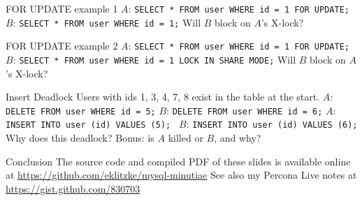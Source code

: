 \documentclass[14pt]{beamer}
\begin{document}
\begin{frame}{FOR UPDATE example 1}
  $A$: \texttt{SELECT * FROM user WHERE id = 1 FOR UPDATE;}
  \newline
  \newline
  $B$: \texttt{SELECT * FROM user WHERE id = 1;}
  \newline
  \newline
  Will $B$ block on $A$'s X-lock?
\end{frame}

\begin{frame}{FOR UPDATE example 2}
  $A$: \texttt{SELECT * FROM user WHERE id = 1 FOR UPDATE;}
  \newline
  \newline
  $B$: \texttt{SELECT * FROM user WHERE id = 1 LOCK IN SHARE MODE;}
  \newline
  \newline
  Will $B$ block on $A$'s X-lock?
\end{frame}

\begin{frame}{Insert Deadlock}
  Users with ids 1, 3, 4, 7, 8 exist in the table at the start.
  \newline
  \newline
  $A$: \texttt{DELETE FROM user WHERE id = 5;}
  \newline
  $B$: \texttt{DELETE FROM user WHERE id = 6;}
  \newline
  $A$: \texttt{INSERT INTO user (id) VALUES (5); }
  \newline
  $B$: \texttt{INSERT INTO user (id) VALUES (6); }
  \newline
  \newline
  Why does this deadlock?
  \newline
  Bonus: is $A$ killed or $B$, and why?
\end{frame}
\begin{frame}{Conclusion}
  The source code and compiled PDF of these slides is available online at
  \newline
  \url{https://github.com/eklitzke/mysql-minutiae}
  \newline
  \newline
  See also my Percona Live notes at
  \newline
  \url{https://gist.github.com/830703}
\end{frame}
\end{document}
